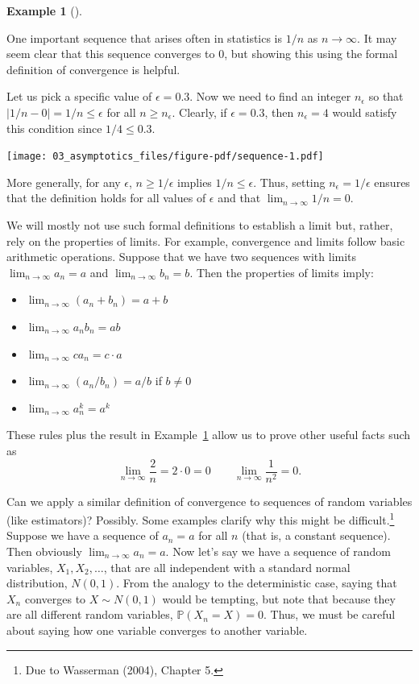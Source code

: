 \documentclass[
  letterpaper,
  DIV=11,
  numbers=noendperiod]{scrreprt}
\providecommand{\tightlist}{%
  \setlength{\itemsep}{0pt}\setlength{\parskip}{0pt}}\usepackage{longtable,booktabs,array}
\renewcommand{\P}{\mathbb{P}}
\theoremstyle{plain}
\theoremstyle{definition}
\theoremstyle{definition}
\newtheorem{example}{Example}[chapter]
\theoremstyle{remark}
\begin{document}
\begin{example}[]\protect\hypertarget{exm-limit}{}\label{exm-limit}

One important sequence that arises often in statistics is \(1/n\) as
\(n\to\infty\). It may seem clear that this sequence converges to 0, but
showing this using the formal definition of convergence is helpful.

Let us pick a specific value of \(\epsilon = 0.3\). Now we need to find
an integer \(n_{\epsilon}\) so that \(|1/n - 0| = 1/n \leq \epsilon\)
for all \(n \geq n_{\epsilon}\). Clearly, if \(\epsilon = 0.3\), then
\(n_{\epsilon} = 4\) would satisfy this condition since
\(1/4 \leq 0.3\).

\texttt{[image: 03\_asymptotics\_files/figure-pdf/sequence-1.pdf]}

More generally, for any \(\epsilon\), \(n \geq 1/\epsilon\) implies
\(1/n \leq \epsilon\). Thus, setting \(n_{\epsilon} = 1/\epsilon\)
ensures that the definition holds for all values of \(\epsilon\) and
that \(\lim_{n\to\infty} 1/n = 0\).

\end{example}

We will mostly not use such formal definitions to establish a limit but,
rather, rely on the properties of limits. For example, convergence and
limits follow basic arithmetic operations. Suppose that we have two
sequences with limits \(\lim_{n\to\infty} a_n = a\) and
\(\lim_{n\to\infty} b_n = b\). Then the properties of limits imply:

\begin{itemize}
\tightlist
\item
  \(\lim_{n\to\infty} (a_n + b_n) = a + b\)
\item
  \(\lim_{n\to\infty} a_nb_n = ab\)
\item
  \(\lim_{n\to\infty} ca_n = c\cdot a\)
\item
  \(\lim_{n\to\infty} (a_n/b_n) = a/b\) if \(b \neq 0\)
\item
  \(\lim_{n\to\infty} a_n^{k} = a^{k}\)
\end{itemize}

These rules plus the result in Example~\ref{exm-limit} allow us to prove
other useful facts such as \[
\lim_{n\to\infty} \frac{2}{n} = 2 \cdot 0 = 0 \qquad  \lim_{n\to\infty} \frac{1}{n^{2}} = 0.
\]

Can we apply a similar definition of convergence to sequences of random
variables (like estimators)? Possibly. Some examples clarify why this
might be difficult.\footnote{Due to Wasserman (2004), Chapter 5.}
Suppose we have a sequence of \(a_n = a\) for all \(n\) (that is, a
constant sequence). Then obviously
\(\lim_{n\rightarrow\infty} a_n = a\). Now let's say we have a sequence
of random variables, \(X_1, X_2, \ldots\), that are all independent with
a standard normal distribution, \(N(0,1)\). From the analogy to the
deterministic case, saying that \(X_n\) converges to \(X \sim N(0, 1)\)
would be tempting, but note that because they are all different random
variables, \(\P(X_n = X) = 0\). Thus, we must be careful about saying
how one variable converges to another variable.
\end{document}
